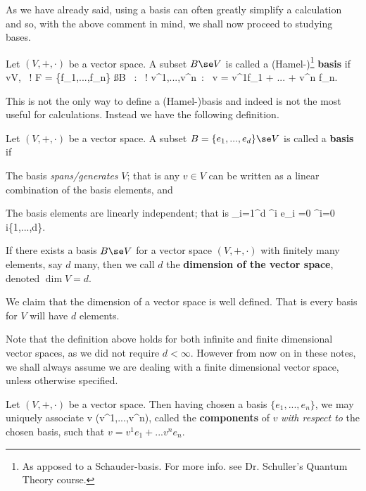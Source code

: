 As we have already said, using a basis can often greatly simplify a calculation and so, with the above comment in mind, we shall now proceed to studying bases. 

    Let $(V,+,\cdot)$ be a vector space. A subset $B\se V$ is called a (Hamel-)\footnote{As apposed to a Schauder-basis. For more info. see Dr. Schuller's Quantum Theory course.} \textbf{basis} if 
    \bse 
        \forall v\in V, \, \exists !  F = \{f_1,...,f_n\} \ss B \, : \, \exists ! v^1,...,v^n\in\R \, : \, v = v^1f_1 + ... + v^n f_n.
    \ese 
\ed 

This is not the only way to define a (Hamel-)basis and indeed is not the most useful for calculations. Instead we have the following definition.

    Let $(V,+,\cdot)$ be a vector space. A subset $B =\{e_1,...,e_d\} \se V$ is called a \textbf{basis} if 
    \benr 
        \item The basis \textit{spans/generates} $V$; that is any $v\in V$ can be written as a linear combination of the basis elements, and 
        \item The basis elements are linearly independent; that is
        \bse 
            \sum_{i=1}^d \lambda^i e_i =0 \quad \implies \quad  \lambda^i=0 \quad \forall i\in \{1,...,d\}.
        \ese 
    \een 
\ed 

    If there exists a basis $B\se V$ for a vector space $(V,+,\cdot)$ with finitely many elements, say $d$ many, then we call $d$ the \textbf{dimension of the vector space}, denoted $\dim V =d$.
\ed 

\bcl 
    We claim that the dimension of a vector space is well defined. That is every basis for $V$ will have $d$ elements. 
\ecl 

Note that the definition above holds for both infinite and finite dimensional vector spaces, as we did not require $d<\infty$. However from now on in these notes, we shall always assume we are dealing with a finite dimensional vector space, unless otherwise specified.

\br 
\label{rem:ComponentsWRTBasis}
    Let $(V,+,\cdot)$ be a vector space. Then having chosen a basis $\{e_1,...,e_n\}$, we may uniquely associate 
    \bse 
        v \mapsto (v^1,...,v^n),
    \ese 
    called the \textbf{components} of $v$ \textit{with respect to} the chosen basis, such that $v=v^1e_1 + ... v^ne_n$.
\er 

